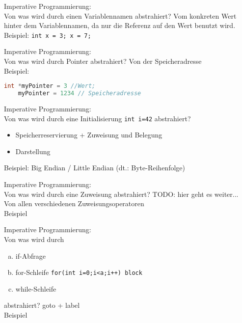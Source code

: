 \begin{card}
	Imperative Programmierung:\\
	Von was wird durch einen Variablennamen abstrahiert?
	\hr
	Vom konkreten Wert hinter dem Variablennamen, da nur die Referenz auf den Wert benutzt wird.\\
		Beispiel: \texttt{int x = 3; x = 7;}
\end{card}

\begin{card}
	Imperative Programmierung:\\
	Von was wird durch Pointer abstrahiert?
	\hr
	Von der Speicheradresse\\
	Beispiel:
	\begin{lstlisting}[language=C]
	int *myPointer = 3 //Wert;
	myPointer = 1234 // Speicheradresse
	\end{lstlisting}
\end{card}

\begin{card}
	Imperative Programmierung:\\
	Von was wird durch eine Initialisierung \texttt{int i=42} abstrahiert?
	\hr
	\begin{itemize}
	\item Speicherreservierung + Zuweisung und Belegung
	\item Darstellung
	\end{itemize}
	Beispiel: Big Endian / Little Endian (dt.: Byte-Reihenfolge)
\end{card}

\begin{card}
	Imperative Programmierung:\\
	Von was wird durch eine Zuweisung abstrahiert?
	\hr
	TODO: hier geht es weiter...
	Von allen verschiedenen Zuweisungsoperatoren\\
	Beispiel
\end{card}

\begin{card}
	Imperative Programmierung:\\
	Von was wird durch 
	\begin{enumerate}[a)]
	\item if-Abfrage
	\item for-Schleife \texttt{for(int i=0;i<a;i++) block} 
	\item while-Schleife
	\end{enumerate}
	abstrahiert?
	\hr
	goto + label\\
	Beispiel
\end{card}

